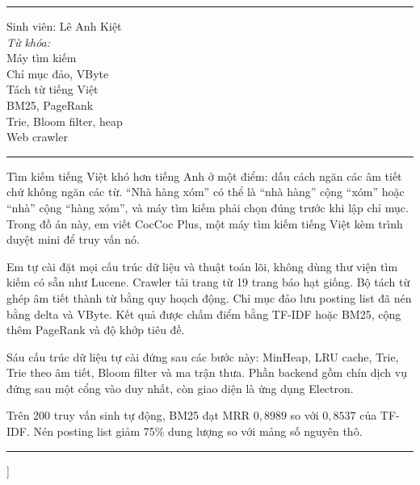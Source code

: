 \documentclass[9pt,twocolumn,a4paper]{extarticle}
\newcommand{\spaced}[1]{\textls[160]{#1}}
\begin{document}
{\begin{@twocolumnfalse}
\noindent\begin{minipage}[t]{0.255\textwidth}
{\footnotesize\spaced{T H Ô N G \ \ T I N}\par}
\vspace{2pt}\noindent\rule{\linewidth}{0.4pt}\par\vspace{3pt}
{\scriptsize Sinh viên: Lê Anh Kiệt\\[3pt]
\textit{Từ khóa:}\\
Máy tìm kiếm\\
Chỉ mục đảo, VByte\\
Tách từ tiếng Việt\\
BM25, PageRank\\
Trie, Bloom filter, heap\\
Web crawler\par}
\end{minipage}\hfill
\begin{minipage}[t]{0.715\textwidth}
{\footnotesize\spaced{T Ó M \ \ T Ắ T}\par}
\vspace{2pt}\noindent\rule{\linewidth}{0.4pt}\par\vspace{3pt}
{\scriptsize\setlength{\parindent}{0pt}\linespread{1.08}\selectfont
Tìm kiếm tiếng Việt khó hơn tiếng Anh ở một điểm: dấu cách ngăn các âm tiết chứ không ngăn các từ. ``Nhà hàng xóm'' có thể là ``nhà hàng'' cộng ``xóm'' hoặc ``nhà'' cộng ``hàng xóm'', và máy tìm kiếm phải chọn đúng trước khi lập chỉ mục. Trong đồ án này, em viết CocCoc Plus, một máy tìm kiếm tiếng Việt kèm trình duyệt mini để truy vấn nó.

Em tự cài đặt mọi cấu trúc dữ liệu và thuật toán lõi, không dùng thư viện tìm kiếm có sẵn như Lucene. Crawler tải trang từ 19 trang báo hạt giống. Bộ tách từ ghép âm tiết thành từ bằng quy hoạch động. Chỉ mục đảo lưu posting list đã nén bằng delta và VByte. Kết quả được chấm điểm bằng TF-IDF hoặc BM25, cộng thêm PageRank và độ khớp tiêu đề.

Sáu cấu trúc dữ liệu tự cài đứng sau các bước này: MinHeap, LRU cache, Trie, Trie theo âm tiết, Bloom filter và ma trận thưa. Phần backend gồm chín dịch vụ đứng sau một cổng vào duy nhất, còn giao diện là ứng dụng Electron.

Trên 200 truy vấn sinh tự động, BM25 đạt MRR $0{,}8989$ so với $0{,}8537$ của TF-IDF. Nén posting list giảm 75\% dung lượng so với mảng số nguyên thô.\par}
\end{minipage}

\vspace{0.25cm}
\noindent\rule{\textwidth}{0.4pt}
\vspace{0.35cm}
\end{@twocolumnfalse}
}]
\end{document}
